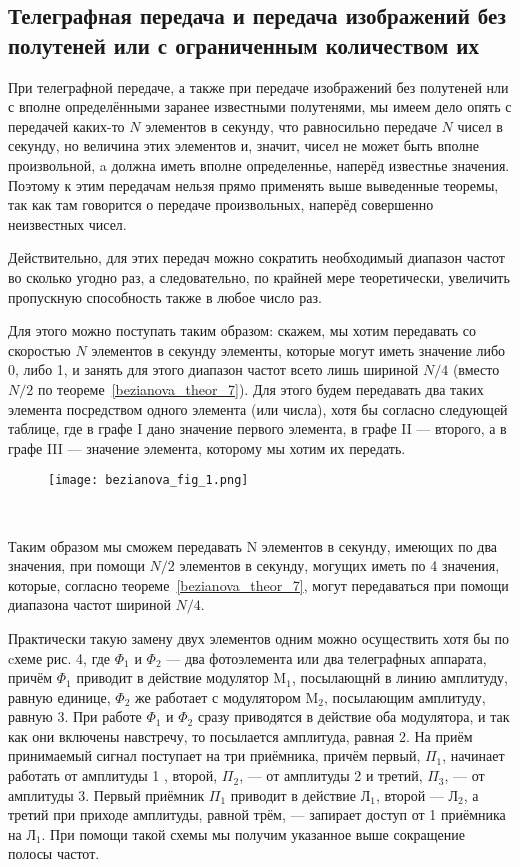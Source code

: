\subsection*{Телеграфная передача и передача изображений без полутеней или с ограниченным количеством их}

\qquad При телеграфной передаче, а также при передаче изображений без полутеней нли с вполне определёнными заранее известными полутенями, мы имеем дело опять с передачей каких-то $N$ элементов в секунду, что равносильно передаче $N$ чисел в секунду, но величина этих элементов и, значит, чисел не может быть вполне произвольной, a должна иметь вполне определеннье, наперёд известнье значения. Поэтому к этим передачам нельзя прямо применять выше выведенные теоремы, так как там говорится о передаче произвольных, наперёд совершенно неизвестных чисел.

Действительно, для этих передач можно сократить необходимый диапазон частот во сколько угодно раз, а следовательно, по крайней мере теоретически, увеличить пропускную способность также в любое число раз.

Для этого можно поступать таким образом: скажем, мы хотим передавать со скоростью $N$ элементов в секунду элементы, которые могут иметь значение либо 0, либо 1, и занять для этого диапазон частот всето лишь шириной $N / 4$ (вместо $N / 2$ по теореме~\ref{bezianova_theor_7}). Для этого будем передавать два таких элемента посредством одного элемента (или числа), хотя бы согласно следующей таблице, где в графе I дано значение первого элемента, в графе II --- второго, а в графе III --- значение элемента, которому мы хотим их передать.

\begin{figure}[H]
        \centering
        \texttt{[image: bezianova\_fig\_1.png]}
        \caption{~}
        \label{fig::bezianova_fig_1}
    \end{figure}

Таким образом мы сможем передавать $\mathrm{N}$ элементов в секунду, имеющих по два значения, при помощи $N / 2$ элементов в секунду, могущих иметь по 4 значения, которые, согласно теореме~\ref{bezianova_theor_7}, могут передаваться при помощи диапазона частот шириной $N / 4$.

Практически такую замену двух элементов одним можно осуществить хотя бы по cхеме рис. 4, где $\Phi_1$ и $\Phi_2$ --- два фотоэлемента или два телеграфных аппарата, причём $\Phi_1$ приводит в действие модулятор $\mathrm{M}_1$, посылающнй в линию амплитуду, равную единице, $\Phi_2$ же работает с модулятором $\mathrm{M}_2$, посылающим амплитуду, равную 3. При работе $\Phi_1$ и $\Phi_2$ сразу приводятся в действие оба модулятора, и так как они включены навстречу, то посылается амплитуда, равная 2. На приём принимаемый сигнал поступает на три приёмника, причём первый, $\Pi_1$, начинает работать от амплитуды 1 , второй, $\Pi_2$, --- от амплитуды 2 и третий, $\Pi_3$, --- от амплитуды 3. Первый приёмник $\Pi_1$ приводит в действие $\text{Л}_1$, второй --- $\text{Л}_2$, а третий при приходе амплитуды, равной трём, --- запирает доступ от 1 приёмника на $\text{Л}_1$. При помощи такой схемы мы получим указанное выше сокращение полосы частот.

